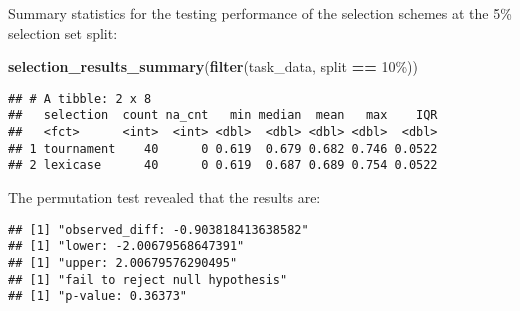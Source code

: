 \documentclass[
]{book}
\newenvironment{Shaded}{\begin{snugshade}}{\end{snugshade}}
\newcommand{\AttributeTok}[1]{\textcolor[rgb]{0.13,0.29,0.53}{#1}}
\newcommand{\DecValTok}[1]{\textcolor[rgb]{0.00,0.00,0.81}{#1}}
\newcommand{\FunctionTok}[1]{\textcolor[rgb]{0.13,0.29,0.53}{\textbf{#1}}}
\newcommand{\NormalTok}[1]{#1}
\newcommand{\OtherTok}[1]{\textcolor[rgb]{0.56,0.35,0.01}{#1}}
\newcommand{\SpecialCharTok}[1]{\textcolor[rgb]{0.81,0.36,0.00}{\textbf{#1}}}
\newcommand{\StringTok}[1]{\textcolor[rgb]{0.31,0.60,0.02}{#1}}
\begin{document}
Summary statistics for the testing performance of the selection schemes at the 5\% selection set split:

\begin{Shaded}
\begin{Highlighting}[]
\FunctionTok{selection\_results\_summary}\NormalTok{(}\FunctionTok{filter}\NormalTok{(task\_data, split }\SpecialCharTok{==} \StringTok{\textquotesingle{}10\%\textquotesingle{}}\NormalTok{))}
\end{Highlighting}
\end{Shaded}

\begin{verbatim}
## # A tibble: 2 x 8
##   selection  count na_cnt   min median  mean   max    IQR
##   <fct>      <int>  <int> <dbl>  <dbl> <dbl> <dbl>  <dbl>
## 1 tournament    40      0 0.619  0.679 0.682 0.746 0.0522
## 2 lexicase      40      0 0.619  0.687 0.689 0.754 0.0522
\end{verbatim}

The permutation test revealed that the results are:

\begin{Shaded}
\end{Shaded}

\begin{verbatim}
## [1] "observed_diff: -0.903818413638582"
## [1] "lower: -2.00679568647391"
## [1] "upper: 2.00679576290495"
## [1] "fail to reject null hypothesis"
## [1] "p-value: 0.36373"
\end{verbatim}
\end{document}
